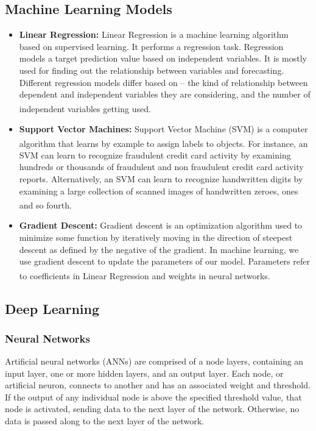 \subsection{Machine Learning Models}
\hspace{\parindent}

\begin{itemize}
  \item \textbf{Linear Regression:}
      Linear Regression is a machine learning algorithm based on supervised learning. It performs a regression task. Regression models a target prediction value based on independent variables. It is mostly used for finding out the relationship between variables and forecasting. Different regression models differ based on – the kind of relationship between dependent and independent variables they are considering, and the number of independent variables getting used. \textsuperscript{\cite{LR-GeeksForGeeks}}
  \item \textbf{Support Vector Machines:}
      Support Vector Machine (SVM) is a computer algorithm that learns by example to assign labels to objects. \textsuperscript{\cite{boser1992training}} For instance, an SVM can learn to recognize fraudulent credit card activity by examining hundreds or thousands of fraudulent and non fraudulent credit card activity reports. Alternatively, an SVM can learn to recognize handwritten digits by examining a large collection of scanned images of handwritten zeroes, ones and so fourth. \textsuperscript{\cite{noble2006support}}
  \item \textbf{Gradient Descent:}
      Gradient descent is an optimization algorithm used to minimize some function by iteratively moving in the direction of steepest descent as defined by the negative of the gradient. In machine learning, we use gradient descent to update the parameters of our model. Parameters refer to coefficients in Linear Regression and weights in neural networks. \textsuperscript{\cite{DG-ml-cheatsheet}}
\end{itemize}

\subsection{Deep Learning}
\subsubsection{Neural Networks}
\hspace{\parindent}
Artificial neural networks (ANNs) are comprised of a node layers, containing an input layer, one or more hidden layers, and an output layer. Each node, or artificial neuron, connects to another and has an associated weight and threshold. If the output of any individual node is above the specified threshold value, that node is activated, sending data to the next layer of the network. Otherwise, no data is passed along to the next layer of the network.

